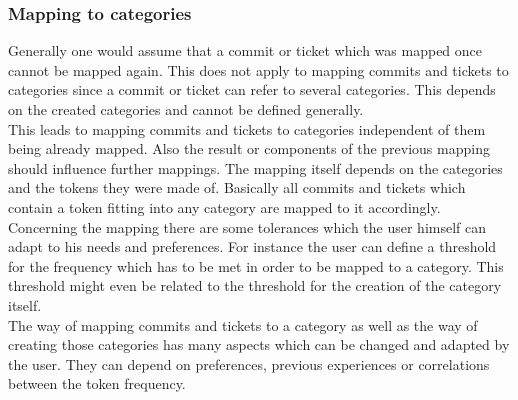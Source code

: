 \subsubsection{Mapping to categories}

Generally one would assume that a commit or ticket which was mapped once cannot be mapped again.
This does not apply to mapping commits and tickets to categories since a commit or ticket can refer to several categories.
This depends on the created categories and cannot be defined generally.\\
This leads to mapping commits and tickets to categories independent of them being already mapped.
Also the result or components of the previous mapping should influence further mappings.
The mapping itself depends on the categories and the tokens they were made of.
Basically all commits and tickets which contain a token fitting into any category are mapped to it accordingly. \\
Concerning the mapping there are some tolerances which the user himself can adapt to his needs and preferences.
For instance the user can define a threshold for the frequency which has to be met in order to be mapped to a category.
This threshold might even be related to the threshold for the creation of the category itself. \\
The way of mapping commits and tickets to a category as well as the way of creating those categories has many aspects which can be changed and adapted by the user.
They can depend on preferences, previous experiences or correlations between the token frequency.

